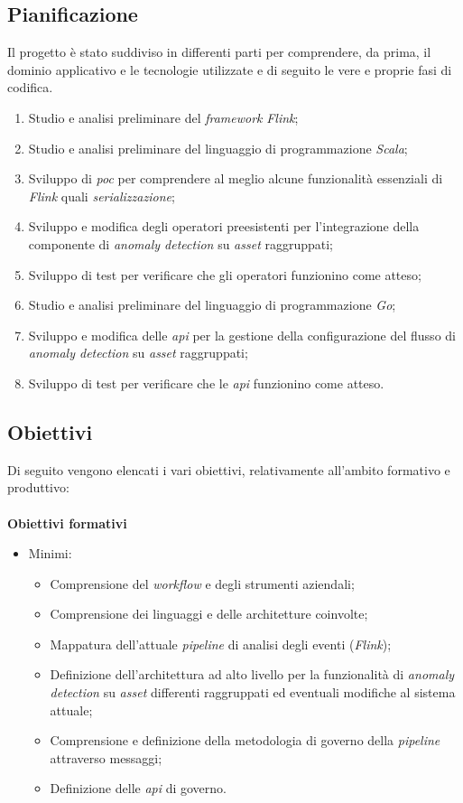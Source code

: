 \subsection{Pianificazione}
Il progetto è stato suddiviso in differenti parti per comprendere, da prima, il dominio applicativo e le tecnologie utilizzate e di seguito le vere e proprie fasi di codifica.

\begin{enumerate}
	\item{Studio e analisi preliminare del \textit{\textit{\gls{framework}}} \textit{Flink};}
	\item{Studio e analisi preliminare del linguaggio di programmazione \textit{Scala};}
	\item{Sviluppo di \textit{\gls{poc}} per comprendere al meglio alcune funzionalità essenziali di \textit{Flink} quali \textit{\gls{serializzazione}};}
	\item{Sviluppo e modifica degli operatori preesistenti per l'integrazione della componente di \textit{anomaly detection} su \textit{asset} raggruppati;}
	\item{Sviluppo di test per verificare che gli operatori funzionino come atteso;}
	\item{Studio e analisi preliminare del linguaggio di programmazione \textit{Go};}
	\item{Sviluppo e modifica delle \textit{\gls{api}} per la gestione della configurazione del flusso di \textit{anomaly detection} su \textit{asset} raggruppati;}
	\item{Sviluppo di test per verificare che le \textit{\gls{api}} funzionino come atteso.}
\end{enumerate}

\subsection{Obiettivi}
Di seguito vengono elencati i vari obiettivi, relativamente all'ambito formativo e produttivo:
\\ \\
\textbf{Obiettivi formativi}
\begin{itemize}
	\item{Minimi:
		\begin{itemize}
			\item{Comprensione del \textit{workflow} e degli strumenti aziendali;}
			\item{Comprensione dei linguaggi e delle architetture coinvolte;}
			\item{Mappatura dell'attuale \textit{\gls{pipeline}} di analisi degli eventi (\textit{Flink});}
			\item{Definizione dell'architettura ad alto livello per la funzionalità di \textit{anomaly detection} su \textit{asset} differenti raggruppati ed eventuali modifiche al sistema attuale;}
			\item{Comprensione e definizione della metodologia di governo della \textit{\gls{pipeline}} attraverso messaggi;}
			\item{Definizione delle \textit{\gls{api}} di governo.}
		\end{itemize}			
	}
\end{itemize}

